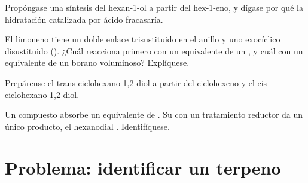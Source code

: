 \begin{exercise}[$\star\star$]\label{exo:b2:alkene-redox:9}
Propóngase una síntesis del hexan-1-ol a partir del hex-1-eno, y dígase por qué la hidratación catalizada
por ácido fracasaría.
\end{exercise}

\begin{exercise}[$\star\star\star$]\label{exo:b2:alkene-redox:10}
El limoneno tiene un doble enlace trisustituido en el anillo y uno exocíclico disustituido
(). ¿Cuál reacciona primero con un equivalente de un , y cuál con
un equivalente de un borano voluminoso? Explíquese.
\end{exercise}

\begin{exercise}[$\star\star\star$]\label{exo:b2:alkene-redox:11}
Prepárense el trans-ciclohexano-1,2-diol a partir del ciclohexeno y el cis-ciclohexano-1,2-diol.
\end{exercise}

\begin{exercise}[$\star\star\star$]\label{exo:b2:alkene-redox:12}
Un compuesto  absorbe un equivalente de . Su  con un tratamiento
reductor da un único producto, el hexanodial . Identifíquese.
\end{exercise}

\section{Problema: identificar un terpeno}

